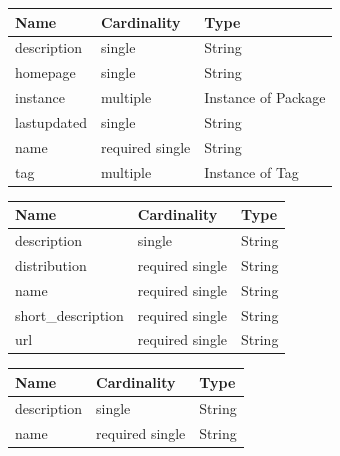 \begin{table}[!h]
   \begin{center}
         \label{tab:main_class_meta}
	\begin{tabular}{p{3cm}p{3cm}p{4cm}}
	\textbf{Name}  & \textbf{Cardinality}  & \textbf{Type}\\
	\hline
	description    & single                & String       \\
	homepage       & single                & String       \\
	instance       & multiple              & Instance of Package       \\
	lastupdated    & single                & String       \\
	name           & required single       & String       \\
	tag            & multiple              & Instance of Tag       \\
	\end{tabular} 
   \end{center}
\end{table}


\begin{table}[!h]
   \begin{center}
         \label{tab:main_class_base}
	\begin{tabular}{p{3cm}p{3cm}p{4cm}}
	\textbf{Name}  & \textbf{Cardinality}  & \textbf{Type}\\
	\hline
	description    & single                & String       \\
	distribution   & required single       & String       \\
	name           & required single       & String       \\
	short\_description & required single   & String       \\
	url            & required single       & String       \\
	\end{tabular} 
   \end{center}
\end{table}


\begin{table}[!h]
   \begin{center}
         \label{tab:main_class_tag}
	\begin{tabular}{p{3cm}p{3cm}p{4cm}}
	\textbf{Name}  & \textbf{Cardinality}  & \textbf{Type}\\
	\hline
	description    & single                & String       \\
	name           & required single       & String       \\
	\end{tabular} 
   \end{center}
\end{table}


